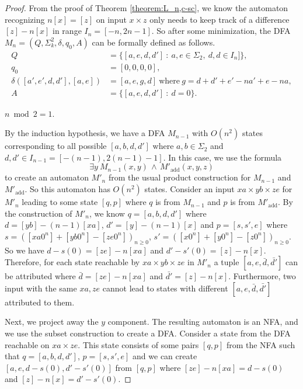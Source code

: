 \documentclass[12pt,reqno]{article}
\def\AND{\, \wedge \, }
\def\suchthat{\ : \ }
\DeclareMathOperator{\add}{add}
\begin{document}
\begin{proof}
From the proof of Theorem \ref{theorem:L_n,c-sc}, we know the automaton recognizing $n[x]= [z]$ on input $x \times z$ only needs to keep track of a difference $[z] - n[x]$ in range $I_n = [-n, 2n-1]$. So after some minimization, the DFA  $M_{n}=(Q, \Sigma^2_k, \delta, q_0, A)$ can be formally defined as follows.
\begin{align*}
Q &= \{ [a, e, d, d']  \suchthat a, e \in \Sigma_2, \ d, d \in I_n] \}, \\
q_0 &= [0, 0, 0, 0], \\
\delta([a', e', d, d'], [a, e]) &= [a, e, g, d] \ \text{where} \ g = d +d' + e'-na' +e -na,
 \\
A &= \{[a, e, d, d'] \suchthat d=0\}.
\end{align*}


\bigskip{} $n \bmod 2 = 1$.

By the induction hypothesis, we have a DFA $M_{n-1}$ with $O(n^2)$ states corresponding to all possible $[a, b, d, d']$ where $a, b \in \Sigma_2$ and $d, d' \in I_{n-1} = [-(n-1), 2(n-1)-1]$.
In this case, we use the formula
$$ \exists y \ M_{n-1}(x,y) \AND M'_{\add}(x, y, z)$$
to create an automaton $M'_{n}$ from the usual product construction for $M_{n-1}$ and $M'_{\add}$. So this automaton has $O(n^2) $ states. Consider an input $xa \times yb \times ze$ for $M'_{n}$ leading to some state $[q, p]$ where $q$ is from $M_{n-1}$ and $p$ is from $M'_{\add}$.
By the construction of $M'_n$, we know $q=[a, b, d, d']$ where $d=[yb]-(n-1)[xa]$, $d'=[y]-(n-1)[x]$ and $p=[s, s', e]$ where $s=([xa0^n] + [yb0^n]-[ze0^n])_{n \geq 0}$, $s'=([x0^n] + [y0^n]-[z0^n])_{n \geq 0}$.
So we have $d-s(0)=[ze]-n[xa]$ and $d'-s'(0)=[z]-n[x]$.
Therefore, for each state reachable by $xa \times yb \times ze$ in $M'_n$ a tuple $[a, e, \bar{d}, \bar{d'}]$ can be attributed where $\bar{d}=[ze]-n[xa]$ and $\bar{d'}=[z]-n[x]$. Furthermore, two input with the same $xa, ze$ cannot lead to states with different $[a, e, \bar{d}, \bar{d'}]$ attributed to them.

Next, we project away the $y$ component.  The resulting automaton is an NFA, and we use the subset construction to create a DFA.  Consider a state from the DFA reachable on $xa \times ze$. This state consists of some pairs $[q, p]$ from the NFA such that $q=[a, b, d, d']$, $p=[s, s', e]$ and
we can create $[a, e, d-s(0), d'-s'(0)]$ from $[q, p]$ where $[ze]-n[xa]=d-s(0)$ and $[z]-n[x]=d'-s'(0)$.


\end{proof}
\end{document}

